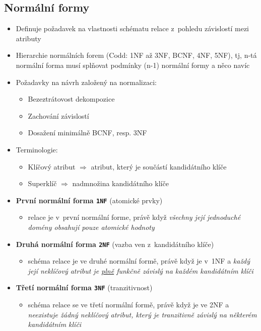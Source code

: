 \documentclass[a4paper,10pt]{article}
\newcommand{\tedy}{$\Rightarrow$ }
\begin{document}
    \subsection{Normální formy}
      \begin{itemize}
        \item Definuje požadavek na vlastnosti schématu relace z~pohledu závislostí mezi atributy
        \item Hierarchie normálních forem (Codd: 1NF až 3NF, BCNF, 4NF, 5NF), tj, n-tá normální forma musí splňovat podmínky (n-1) normální formy a něco navíc
        \item Požadavky na návrh založený na normalizaci:
        \begin{itemize}
          \item Bezeztrátovost dekompozice
          \item Zachování závislostí
          \item Dosažení minimálně BCNF, resp. 3NF
        \end{itemize}
        \item Terminologie:
        \begin{itemize}
          \item Klíčový atribut \tedy atribut, který je součástí kandidátního klíče
          \item Superklíč \tedy nadmnožina kandidátního klíče
        \end{itemize}

        \item \textbf{První normální forma \texttt{1NF}} \hfill {\small (atomické prvky)}
        \begin{itemize}
          \item relace je v~první normální forme, právě když \emph{všechny její jednoduché domény obsahují pouze atomické hodnoty}
        \end{itemize}

        \item \textbf{Druhá normální forma \texttt{2NF}} \hfill {\small (vazba ven z~kandidátního klíče)}
        \begin{itemize}
          \item schéma relace je ve druhé normální formě, právě když je v~1NF a \emph{každý její neklíčový atribut je \underline{plně} funkčně závislý na každém kandidátním klíči}
        \end{itemize}

        \item \textbf{Třetí normální forma \texttt{3NF}} \hfill {\small (tranzitivnost)}
        \begin{itemize}
          \item schéma relace se ve třetí normální formě, právě když je ve 2NF a \emph{neexistuje žádný neklíčový atribut, který je tranzitivně závislý na některém kandidátním klíči}
        \end{itemize}


\end{itemize}
\end{document}

